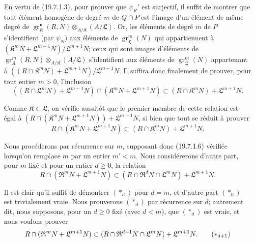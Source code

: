 \begin{env}[19.7.1.5]
\label{IV.19.7.1.5}
En vertu de (19.7.1.3), pour prouver que $\psi_R'$ est surjectif, il suffit de montrer que tout élément homogène de degré $m$ de $Q\cap P$ est l'image d'un élément de même degré de $\operatorname{gr}_{\mathfrak K}^\bullet(R,N)\otimes_{A/\mathfrak K}(A/\mathfrak L)$. Or, les éléments de degré $m$ de $P$ s'identifient (par $\psi_N$) aux éléments de $\operatorname{gr}_{\mathfrak L}^m(N)$ qui appartiennent à $(\mathfrak K^mN+\mathfrak L^{m+1}N)/\mathfrak L^{m+1}N$; ceux qui sont images d'éléments de $\operatorname{gr}_{\mathfrak K}^m(R,N)\otimes_{A/\mathfrak K}(A/\mathfrak L)$ s'identifient aux éléments de $\operatorname{gr}_{\mathfrak L}^m(N)$ appartenant à $((R\cap\mathfrak K^mN)+\mathfrak L^{m+1}N)/\mathfrak L^{m+1}N$. Il suffira donc finalement de prouver, pour tout entier $m>0$, l'inclusion
\[
  ((R\cap\mathfrak L^mN)+\mathfrak L^{m+1}N)\cap(\mathfrak K^mN+\mathfrak L^{m+1}N)\subset(R\cap\mathfrak K^mN)+\mathfrak L^{m+1}N.
\]

Comme $\mathfrak K\subset\mathfrak L$, on vérifie aussitôt que le premier membre de cette relation est égal à $(R\cap(\mathfrak K^mN+\mathfrak L^{m+1}N))+\mathfrak L^{m+1}N$, si bien que tout se réduit à prouver
\begin{equation}
  R\cap(\mathfrak K^mN+\mathfrak L^{m+1}N)\subset(R\cap\mathfrak K^mN)+\mathfrak L^{m+1}N.
  \tag{19.7.1.6}\label{IV.19.7.1.6}
\end{equation}
\end{env}


Nous procéderons par récurrence sur $m$, supposant donc (19.7.1.6) vérifiée lorsqu'on remplace $m$ par un entier $m'<m$. Nous considérerons d'autre part, pour $m$ fixé et pour un entier $d\geq0$, la relation
\begin{equation}
  R\cap(\mathfrak R^mN+\mathfrak L^{m+1}N)\subset(R\cap\mathfrak R^dN\cap\mathfrak L^mN)+\mathfrak L^{m+1}N.
  \tag{$*_d$}
\end{equation}

Il est clair qu'il suffit de démontrer $(*_d)$ pour $d=m$, et d'autre part $(*_0)$ est trivialement vraie. Nous prouverons $(*_d)$ par récurrence sur $d$; autrement dit, nous supposons, pour un $d\geq0$ fixé (avec $d<m$), que $(*_d)$ est vraie, et nous voulons prouver
\begin{equation}
  R\cap(\mathfrak R^mN+\mathfrak L^{m+1}N)\subset(R\cap\mathfrak R^{d+1}N\cap\mathfrak L^mN)+\mathfrak L^{m+1}N.
  \tag{$*_{d+1}$}
\end{equation}

